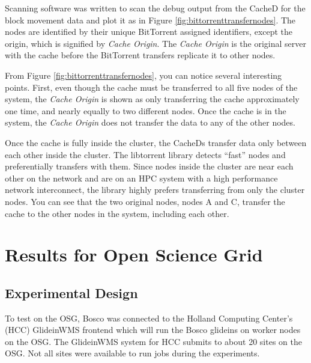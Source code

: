 Scanning software was written to scan the debug output from the CacheD for the block movement data and plot it as in Figure \ref{fig:bittorrenttransfernodes}.  The nodes are identified by their unique BitTorrent assigned identifiers, except the origin, which is signified by \textit{Cache Origin}.  The \textit{Cache Origin} is the original server with the cache before the BitTorrent transfers replicate it to other nodes.

From Figure \ref{fig:bittorrenttransfernodes}, you can notice several interesting points.  First, even though the cache must be transferred to all five nodes of the system, the \textit{Cache Origin} is shown as only transferring the cache approximately one time, and nearly equally to two different nodes.  Once the cache is in the system, the \textit{Cache Origin} does not transfer the data to any of the other nodes.  

Once the cache is fully inside the cluster, the CacheDs transfer data only between each other inside the cluster.  The libtorrent library detects ``fast'' nodes and preferentially transfers with them.  Since nodes inside the cluster are near each other on the network and are on an HPC system with a high performance network interconnect, the library highly prefers transferring from only the cluster nodes.  You can see that the two original nodes, nodes A and C, transfer the cache to the other nodes in the system, including each other.


\section{Results for Open Science Grid}

\subsection{Experimental Design}
To test on the OSG, Bosco was connected to the Holland Computing Center's (HCC) GlideinWMS frontend which will run the Bosco glideins on worker nodes on the OSG.  The GlideinWMS system for HCC submits to about 20 sites on the OSG.  Not all sites were available to run jobs during the experiments.

